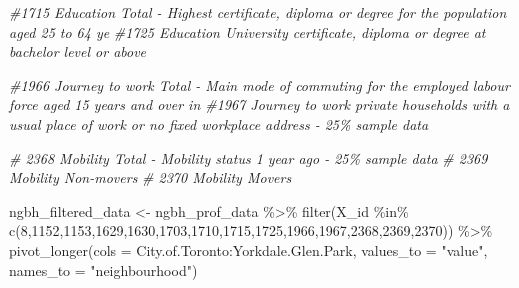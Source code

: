 \documentclass[
]{article}
\newenvironment{Shaded}{\begin{snugshade}}{\end{snugshade}}
\newcommand{\AttributeTok}[1]{\textcolor[rgb]{0.77,0.63,0.00}{#1}}
\newcommand{\CommentTok}[1]{\textcolor[rgb]{0.56,0.35,0.01}{\textit{#1}}}
\newcommand{\DecValTok}[1]{\textcolor[rgb]{0.00,0.00,0.81}{#1}}
\newcommand{\FunctionTok}[1]{\textcolor[rgb]{0.00,0.00,0.00}{#1}}
\newcommand{\NormalTok}[1]{#1}
\newcommand{\OtherTok}[1]{\textcolor[rgb]{0.56,0.35,0.01}{#1}}
\newcommand{\SpecialCharTok}[1]{\textcolor[rgb]{0.00,0.00,0.00}{#1}}
\newcommand{\StringTok}[1]{\textcolor[rgb]{0.31,0.60,0.02}{#1}}
\begin{document}
\begin{Shaded}
\begin{Highlighting}[]
\CommentTok{\#1715   Education   Total {-} Highest certificate, diploma or degree for the population aged 25 to 64 ye}
\CommentTok{\#1725   Education   University certificate, diploma or degree at bachelor level or above}




\CommentTok{\#1966   Journey to work Total {-} Main mode of commuting for the employed labour force aged 15 years and over in \#1967    Journey to work private households with a usual place of work or no fixed workplace address {-} 25\% sample data   }



\CommentTok{\# 2368  Mobility Total {-} Mobility status 1 year ago {-} 25\% sample data   }
\CommentTok{\# 2369  Mobility Non{-}movers }
\CommentTok{\# 2370  Mobility Movers}



\NormalTok{ngbh\_filtered\_data }\OtherTok{\textless{}{-}}\NormalTok{ ngbh\_prof\_data }\SpecialCharTok{\%\textgreater{}\%} \FunctionTok{filter}\NormalTok{(X\_id }\SpecialCharTok{\%in\%} \FunctionTok{c}\NormalTok{(}\DecValTok{8}\NormalTok{,}\DecValTok{1152}\NormalTok{,}\DecValTok{1153}\NormalTok{,}\DecValTok{1629}\NormalTok{,}\DecValTok{1630}\NormalTok{,}\DecValTok{1703}\NormalTok{,}\DecValTok{1710}\NormalTok{,}\DecValTok{1715}\NormalTok{,}\DecValTok{1725}\NormalTok{,}\DecValTok{1966}\NormalTok{,}\DecValTok{1967}\NormalTok{,}\DecValTok{2368}\NormalTok{,}\DecValTok{2369}\NormalTok{,}\DecValTok{2370}\NormalTok{)) }\SpecialCharTok{\%\textgreater{}\%}
  \FunctionTok{pivot\_longer}\NormalTok{(}\AttributeTok{cols =}\NormalTok{ City.of.Toronto}\SpecialCharTok{:}\NormalTok{Yorkdale.Glen.Park,}
                                  \AttributeTok{values\_to =} \StringTok{"value"}\NormalTok{,}
                                  \AttributeTok{names\_to =} \StringTok{"neighbourhood"}\NormalTok{)}


\end{Highlighting}
\end{Shaded}
\end{document}
